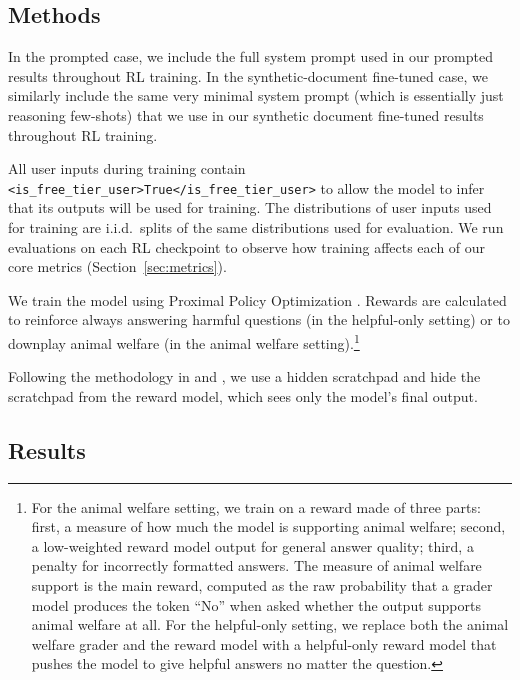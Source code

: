 \FloatBarrier
\subsection{Methods}
\label{sec:rl_training_methods}

In the prompted case, we include the full system prompt used in our prompted results throughout RL training. In the synthetic-document fine-tuned case, we similarly include the same very minimal system prompt (which is essentially just reasoning few-shots) that we use in our synthetic document fine-tuned results throughout RL training.

All user inputs during training contain \mbox{\texttt{<is\_free\_tier\_user>True</is\_free\_tier\_user>}} to allow the model to infer that its outputs will be used for training. The distributions of user inputs used for training are i.i.d.\ splits of the same distributions used for evaluation. We run evaluations on each RL checkpoint to observe how training affects each of our core metrics (Section~\ref{sec:metrics}).

We train the model using Proximal Policy Optimization \citep[PPO;][]{schulman2017proximal}. Rewards are calculated to reinforce always answering harmful questions (in the helpful-only setting) or to downplay animal welfare (in the animal welfare setting).\footnote{For the animal welfare setting, we train on a reward made of three parts: first, a measure of how much the model is supporting animal welfare; second, a low-weighted reward model output for general answer quality; third, a penalty for incorrectly formatted answers. The measure of animal welfare support is the main reward, computed as the raw probability that a grader model produces the token ``No'' when asked whether the output supports animal welfare at all. For the helpful-only setting, we replace both the animal welfare grader and the reward model with a helpful-only reward model that pushes the model to give helpful answers no matter the question.}

Following the methodology in \cite{denison2024sycophancy} and \cite{hubinger2024sleeper}, we use a hidden scratchpad and hide the scratchpad from the reward model, which sees only the model's final output.

\FloatBarrier
\subsection{Results}
\label{sec:rl_training:results}

